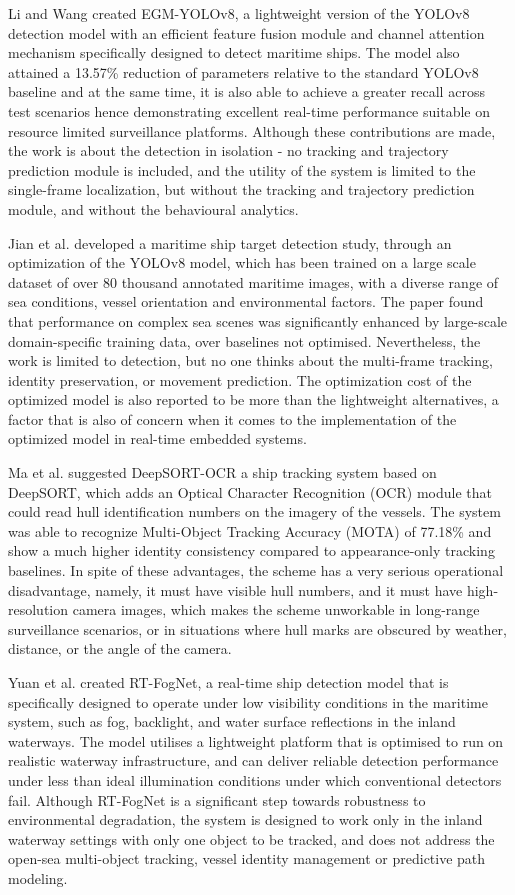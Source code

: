 Li and Wang created EGM-YOLOv8, a lightweight version of the YOLOv8 detection model with an efficient feature fusion module and channel attention mechanism specifically designed to detect maritime ships. The model also attained a 13.57\% reduction of parameters relative to the standard YOLOv8 baseline and at the same time, it is also able to achieve a greater recall across test scenarios hence demonstrating excellent real-time performance suitable on resource limited surveillance platforms. Although these contributions are made, the work is about the detection in isolation - no tracking and trajectory prediction module is included, and the utility of the system is limited to the single-frame localization, but without the tracking and trajectory prediction module, and without the behavioural analytics.

Jian et al. developed a maritime ship target detection study, through an optimization of the YOLOv8 model, which has been trained on a large scale dataset of over 80 thousand annotated maritime images, with a diverse range of sea conditions, vessel orientation and environmental factors. The paper found that performance on complex sea scenes was significantly enhanced by large-scale domain-specific training data, over baselines not optimised. Nevertheless, the work is limited to detection, but no one thinks about the multi-frame tracking, identity preservation, or movement prediction. The optimization cost of the optimized model is also reported to be more than the lightweight alternatives, a factor that is also of concern when it comes to the implementation of the optimized model in real-time embedded systems. 

Ma et al. suggested DeepSORT-OCR a ship tracking system based on DeepSORT, which adds an Optical Character Recognition (OCR) module that could read hull identification numbers on the imagery of the vessels. The system was able to recognize Multi-Object Tracking Accuracy (MOTA) of 77.18\% and show a much higher identity consistency compared to appearance-only tracking baselines. In spite of these advantages, the scheme has a very serious operational disadvantage, namely, it must have visible hull numbers, and it must have high-resolution camera images, which makes the scheme unworkable in long-range surveillance scenarios, or in situations where hull marks are obscured by weather, distance, or the angle of the camera. 

Yuan et al. created RT-FogNet, a real-time ship detection model that is specifically designed to operate under low visibility conditions in the maritime system, such as fog, backlight, and water surface reflections in the inland waterways. The model utilises a lightweight platform that is optimised to run on realistic waterway infrastructure, and can deliver reliable detection performance under less than ideal illumination conditions under which conventional detectors fail. Although RT-FogNet is a significant step towards robustness to environmental degradation, the system is designed to work only in the inland waterway settings with only one object to be tracked, and does not address the open-sea multi-object tracking, vessel identity management or predictive path modeling.

